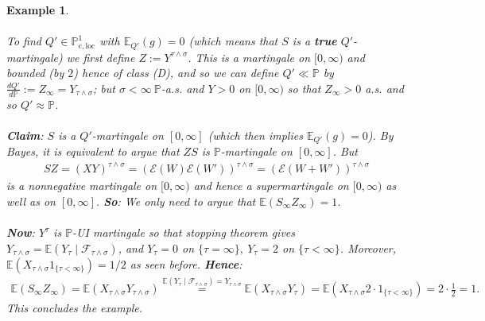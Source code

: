 \documentclass[12pt,a4paper, twoside]{article}
\newtheorem{exmp}{Example}[section]
\theoremstyle{definition}
\newcommand{\EE}{\mathbb{E}} %
\newcommand{\PP}{\mathbb{P}} %
\begin{document}
\begin{exmp}
\\\\
To find $Q' \in \PP_{e, \text{loc}}^1$ with $\EE_{Q'}(g)=0$ (which means that $S$ is a \textbf{true} $Q'$-martingale) we first define $Z:= Y^{ \tau \wedge \sigma}$. This is a martingale on $[0, \infty)$ and bounded (by $2$) hence of class (D), and so we can define $Q' \ll \PP$ by $\frac{dQ'}{d \PP}:= Z_\infty = Y_{\tau \wedge \sigma}$; but $\sigma < \infty \ \PP$-a.s. and $Y>0$ on $[0, \infty)$ so that $Z_\infty>0$ a.s. and so $Q' \approx \PP$. 
\\\\
\textbf{Claim}: $S$ is a $Q'$-martingale on $[0, \infty]$ (which then implies $\EE_{Q'}(g)=0$). By Bayes, it is equivalent to argue that $ZS$ is $\PP$-martingale on $[0, \infty]$. But 
\begin{align*}
SZ = (XY)^{ \tau \wedge \sigma} = ( \mathcal{E}(W) \mathcal{E}(W'))^{ \tau \wedge \sigma} = ( \mathcal{E}( W + W'))^{ \tau \wedge \sigma}
\end{align*}
is a nonnegative martingale on $[0, \infty)$ and hence a supermartingale on $[0, \infty)$ as well as on $[0, \infty]$. \textbf{So}: We only need to argue that $\EE(S_\infty Z_\infty)=1$. 
\\\\
\textbf{Now}: $Y^\tau$ is $\PP$-UI martingale so that stopping theorem gives $Y_{ \tau \wedge \sigma} = \EE( Y_\tau \mid \mathcal{F}_{\tau \wedge \sigma})$, and $Y_\tau =0$ on $\{ \tau = \infty\}, \ Y_\tau =2$ on $\{ \tau < \infty\}$. Moreover, $\EE( X_{ \tau \wedge \sigma} 1_{\{ \tau < \infty\}} ) = 1/2$ as seen before. \textbf{Hence}:  
\begin{align*}
\EE( S_\infty Z_\infty) = \EE( X_{ \tau \wedge \sigma} Y_{ \tau \wedge \sigma}) \overset{ \EE(Y_\tau \mid \mathcal{F}_{ \tau \wedge \sigma})= Y_{ \tau \wedge \sigma}}= \EE( X_{ \tau \wedge \sigma} Y_\tau ) = \EE( X_{ \tau \wedge \sigma} 2 \cdot 1_{\{ \tau < \infty\}}) = 2 \cdot \frac{1}{2}=1. 
\end{align*}
This concludes the example. 
\end{exmp}
\newpage
\end{document}
